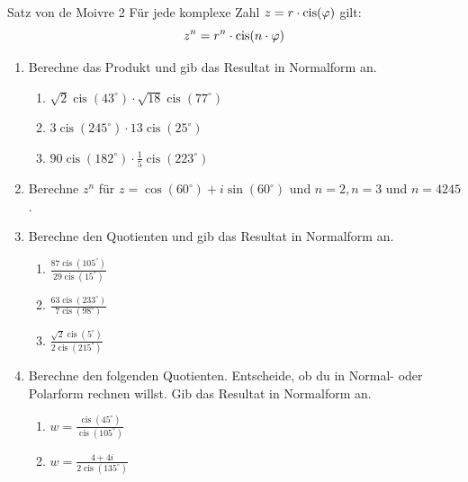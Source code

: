 \begin{satz}
    {Satz von de Moivre 2}{}
    Für jede komplexe Zahl $z= r\cdot\mathrm{cis}(\varphi)$ gilt:
    $$z^n = r^n \cdot\mathrm{cis}(n\cdot\varphi)$$
    
    \end{satz}
\clearpage
\begin{ueb}
    {}{}
    \begin{enumerate}
        \item Berechne das Produkt und gib das Resultat in Normalform an.

        \begin{enumerate}
            \item \( \sqrt{2} \operatorname{cis}(43^\circ) \cdot \sqrt{18} \operatorname{cis}(77^\circ) \)
            \item \( 3 \operatorname{cis}(245^\circ) \cdot 13 \operatorname{cis}(25^\circ) \)
            \item \( 90 \operatorname{cis}(182^\circ) \cdot \frac{1}{5} \operatorname{cis}(223^\circ) \)
        \end{enumerate}
        
         \item Berechne $z^n$ für $z = \cos(60^\circ) + i \sin(60^\circ)$ und $n=2, n=3$ und $n=4245$.
    
        \item Berechne den Quotienten und gib das Resultat in Normalform an.
        \begin{enumerate}
            \item $\frac{87 \operatorname{cis}(105^\circ)}{29 \operatorname{cis}(15^\circ)}$
            \item $\frac{63 \operatorname{cis}(233^\circ)}{7 \operatorname{cis}(98^\circ)}$
            \item $\frac{\sqrt{2} \operatorname{cis}(5^\circ)}{2 \operatorname{cis}(215^\circ)}$
        \end{enumerate}
    
        \item Berechne den folgenden Quotienten. Entscheide, ob du in Normal- oder Polarform rechnen willst. Gib das Resultat in Normalform an.
        \begin{enumerate}
            \item $w = \frac{\operatorname{cis}(45^\circ)}{\operatorname{cis}(105^\circ)}$
            \item $w = \frac{4 + 4i}{2 \operatorname{cis}(135^\circ)}$
        \end{enumerate}
    

\end{enumerate}
\end{ueb}
